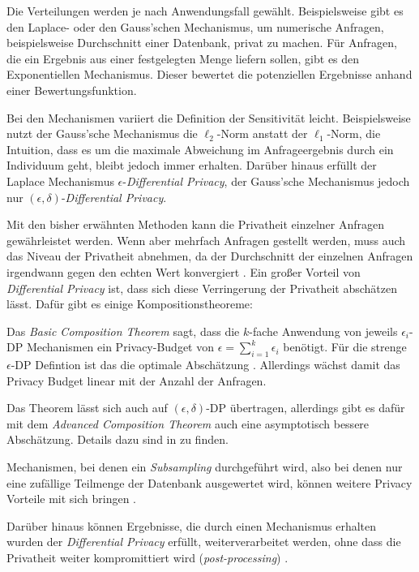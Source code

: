Die Verteilungen werden je nach Anwendungsfall gewählt. Beispielsweise gibt es den Laplace- oder den Gauss'schen Mechanismus, um numerische Anfragen, beispielsweise Durchschnitt einer Datenbank, privat zu machen. Für Anfragen, die ein Ergebnis aus einer festgelegten Menge liefern sollen, gibt es den Exponentiellen Mechanismus. Dieser bewertet die potenziellen Ergebnisse anhand einer Bewertungsfunktion.\cite{mcsherry:2007}

Bei den Mechanismen variiert die Definition der Sensitivität leicht. Beispielsweise nutzt der Gauss'sche Mechanismus die $\ell_2$-Norm anstatt der $\ell_1$-Norm, die Intuition, dass es um die maximale Abweichung im Anfrageergebnis durch ein Individuum geht, bleibt jedoch immer erhalten. Darüber hinaus erfüllt der Laplace Mechanismus $\epsilon$-\textit{Differential Privacy}, der Gauss'sche Mechanismus jedoch nur $(\epsilon, \delta)$-\textit{Differential Privacy}.\cite[p.261ff]{dwork:2014}

Mit den bisher erwähnten Methoden kann die Privatheit einzelner Anfragen gewährleistet werden. Wenn aber mehrfach Anfragen gestellt werden, muss auch das Niveau der Privatheit abnehmen, da der Durchschnitt der einzelnen Anfragen irgendwann gegen den echten Wert konvergiert \cite[p.42]{dwork:2014}. Ein großer Vorteil von \textit{Differential Privacy} ist, dass sich diese Verringerung der Privatheit abschätzen lässt. Dafür gibt es einige Kompositionstheoreme:

Das \textit{Basic Composition Theorem} sagt, dass die $k$-fache Anwendung von jeweils $\epsilon_i$-DP Mechanismen ein Privacy-Budget von $\epsilon = \sum_{i=1}^{k} \epsilon_i$ benötigt. Für die strenge $\epsilon$-DP Defintion ist das die optimale Abschätzung \cite{steinke:2022}. Allerdings wächst damit das Privacy Budget linear mit der Anzahl der Anfragen. 

Das Theorem lässt sich auch auf $(\epsilon, \delta)$-DP übertragen, allerdings gibt es dafür mit dem \textit{Advanced Composition Theorem} auch eine asymptotisch bessere Abschätzung. Details dazu sind in \textcite{dwork:2010, steinke:2022} zu finden.

Mechanismen, bei denen ein \textit{Subsampling} durchgeführt wird, also bei denen nur eine zufällige Teilmenge der Datenbank ausgewertet wird, können weitere Privacy Vorteile mit sich bringen \cite{mironov:2019, steinke:2022}.

Darüber hinaus können Ergebnisse, die durch einen Mechanismus erhalten wurden der \textit{Differential Privacy} erfüllt, weiterverarbeitet werden, ohne dass die Privatheit weiter kompromittiert wird (\textit{post-processing}) \cite{dwork:2014}.

